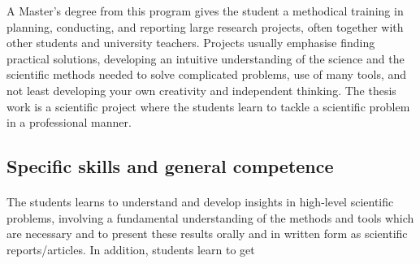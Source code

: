 \documentclass[%
oneside,                 %
final,                   %
10pt]{article}
\begin{document}
A Master’s degree from this program gives the student   a methodical training in planning, conducting, and reporting large research projects, often together with other students and university teachers. 
Projects usually emphasise finding practical solutions,
developing an intuitive understanding of the science and the
scientific methods needed to solve complicated problems, use of many
tools, and not least developing your own creativity and independent
thinking. The thesis work is a scientific project where the students learn to
tackle a scientific problem in a professional manner.



\subsection*{Specific skills and general competence}

\paragraph{}
The students learns to understand and develop insights in high-level scientific problems, involving a fundamental understanding of the methods and tools which are necessary and to present these results orally and in written form as scientific reports/articles. In addition, students learn to get
\end{document}
